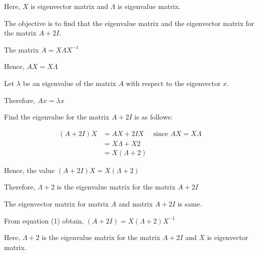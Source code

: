 \documentclass{article}
\begin{document}
Here, $X$ is eigenvector matrix and $\Lambda$ is eigenvalue matrix.

The objective is to find that the eigenvalue matrix and the eigenvector matrix for the matrix $A+2 I$.

The matrix $A=X \Lambda X^{-1}$

Hence, $A X=X \Lambda$

Let $\lambda$ be an eigenvalue of the matrix $A$ with respect to the eigenvector $x$.

Therefore, $A x=\lambda x$

Find the eigenvalue for the matrix $A+2 I$ is as follows:

$$
\begin{aligned}
(A+2 I) X & =A X+2 I X \quad \text { since } A X=X \Lambda \\
& =X \Lambda+X 2 \\
& =X(\Lambda+2)
\end{aligned}
$$

Hence, the value $(A+2 I) X=X(\Lambda+2)$

Therefore, $\Lambda+2$ is the eigenvalue matrix for the matrix $A+2 I$

The eigenvector matrix for matrix $A$ and matrix $A+2 I$ is same.

From equation (1) obtain, $(A+2 I)=X(\Lambda+2) X^{-1}$

Here, $\Lambda+2$ is the eigenvalue matrix for the matrix $A+2 I$ and $X$ is eigenvector matrix.
%
\end{document}
